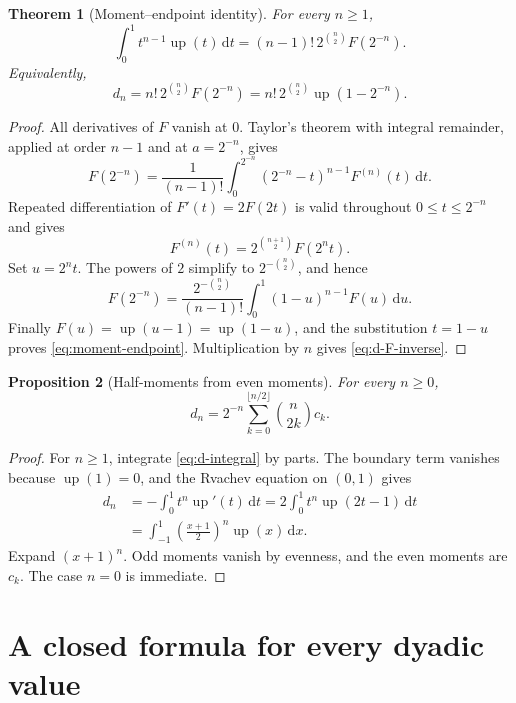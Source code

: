 \documentclass[11pt]{article}
\numberwithin{equation}{section}
\newtheorem{theorem}{Theorem}[section]
\newtheorem{proposition}[theorem]{Proposition}
\theoremstyle{definition}
\theoremstyle{remark}
\newcommand{\dd}{\,\mathrm{d}}
\newcommand{\upf}{\operatorname{up}}
\begin{document}
\begin{theorem}[Moment--endpoint identity]\label{thm:moment-endpoint}
For every $n\ge1$,
\begin{equation}\label{eq:moment-endpoint}
 \int_0^1t^{n-1}\upf(t)\dd t
 =(n-1)!\,2^{\binom n2}F(2^{-n}).
\end{equation}
Equivalently,
\begin{equation}\label{eq:d-F-inverse}
 d_n=n!\,2^{\binom n2}F(2^{-n})
    =n!\,2^{\binom n2}\upf(1-2^{-n}).
\end{equation}
\end{theorem}

\begin{proof}
All derivatives of $F$ vanish at $0$.  Taylor's theorem with integral
remainder, applied at order $n-1$ and at $a=2^{-n}$, gives
\[
 F(2^{-n})=\frac1{(n-1)!}
 \int_0^{2^{-n}}(2^{-n}-t)^{n-1}F^{(n)}(t)\dd t.
\]
Repeated differentiation of $F'(t)=2F(2t)$ is valid throughout
$0\le t\le2^{-n}$ and gives
\[
 F^{(n)}(t)=2^{\binom{n+1}{2}}F(2^nt).
\]
Set $u=2^nt$.  The powers of $2$ simplify to
$2^{-\binom n2}$, and hence
\[
 F(2^{-n})=\frac{2^{-\binom n2}}{(n-1)!}
 \int_0^1(1-u)^{n-1}F(u)\dd u.
\]
Finally $F(u)=\upf(u-1)=\upf(1-u)$, and the substitution $t=1-u$ proves
\eqref{eq:moment-endpoint}.  Multiplication by $n$ gives
\eqref{eq:d-F-inverse}.
\end{proof}

\begin{proposition}[Half-moments from even moments]\label{prop:d-from-c}
For every $n\ge0$,
\begin{equation}\label{eq:d-from-c}
 d_n=2^{-n}\sum_{k=0}^{\lfloor n/2\rfloor}
 \binom{n}{2k}c_k.
\end{equation}
\end{proposition}

\begin{proof}
For $n\ge1$, integrate \eqref{eq:d-integral} by parts.  The boundary term
vanishes because $\upf(1)=0$, and the Rvachev equation on $(0,1)$ gives
\begin{align*}
 d_n
 &=-\int_0^1t^n\upf'(t)\dd t
   =2\int_0^1t^n\upf(2t-1)\dd t\\
 &=\int_{-1}^{1}\left(\frac{x+1}{2}\right)^n\upf(x)\dd x.
\end{align*}
Expand $(x+1)^n$.  Odd moments vanish by evenness, and the even moments are
$c_k$.  The case $n=0$ is immediate.
\end{proof}

\section{A closed formula for every dyadic value}
\label{sec:dyadic-closed-form}
\end{document}
